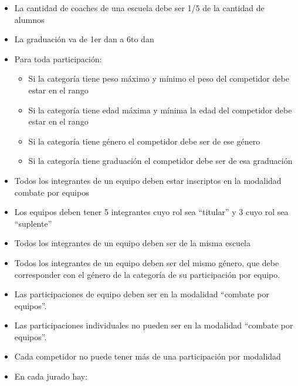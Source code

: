\documentclass[a4paper]{article}
\begin{document}
\begin{itemize}

\item La cantidad de coaches de una escuela debe ser 1/5 de la cantidad de alumnos

\item La graduación va de 1er dan a 6to dan

\item Para toda participación:

\begin{itemize}

\item Si la categoría tiene peso máximo y mínimo el peso del competidor debe estar en el rango

\item Si la categoría tiene edad máxima y mínima la edad del competidor debe estar en el rango

\item Si la categoría tiene género el competidor debe ser de ese género

\item Si la categoría tiene graduación el competidor debe ser de esa graduación

\end{itemize}

\item Todos los integrantes de un equipo deben estar inscriptos en la modalidad combate por equipos

\item Los equipos deben tener 5 integrantes cuyo rol sea “titular” y 3 cuyo rol sea “suplente”

\item Todos los integrantes de un equipo deben ser de la misma escuela

\item Todos los integrantes de un equipo deben ser del mismo género, que debe corresponder con el género de la categoría de su participación por equipo.

\item Las participaciones de equipo deben ser en la modalidad “combate por equipos”.

\item Las participaciones individuales no pueden ser en la modalidad “combate por equipos”.

\item Cada competidor no puede tener más de una participación por modalidad

\item En cada jurado hay:


\end{itemize}
\end{document}
